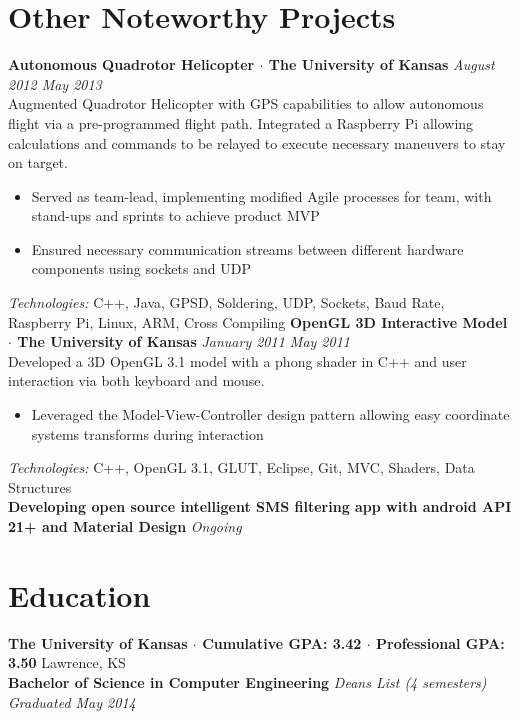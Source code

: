 \documentclass[10pt]{extarticle}
\begin{document}
\section*{Other Noteworthy Projects}
\textbf{Autonomous Quadrotor Helicopter $\cdot$ The University of Kansas} \hfill \textit{August 2012 \textendash{} May 2013} \\
Augmented Quadrotor Helicopter with GPS capabilities to allow autonomous flight via a pre-programmed flight path. Integrated a Raspberry Pi allowing calculations and commands to be relayed to execute necessary maneuvers to stay on target.
\begin{itemize}
  \item Served as team-lead, implementing modified Agile processes for team, with stand-ups and sprints to achieve product MVP
  \item Ensured necessary communication streams between different hardware components using sockets and UDP
\end{itemize}
\textit{Technologies:} C++, Java, GPSD, Soldering, UDP, Sockets, Baud Rate, Raspberry Pi, Linux, ARM, Cross Compiling
\textbf{OpenGL 3D Interactive Model $\cdot$ The University of Kansas} \hfill \textit{January 2011 \textendash{} May 2011} \\
Developed a 3D OpenGL 3.1 model with a phong shader in C++ and user interaction via both keyboard and mouse.
\begin{itemize}
  \item Leveraged the Model-View-Controller design pattern allowing easy coordinate systems transforms during interaction
\end{itemize}
\textit{Technologies:} C++, OpenGL 3.1, GLUT, Eclipse, Git, MVC, Shaders, Data Structures \\
\textbf{Developing open source intelligent SMS filtering app with android API 21+ and Material Design} \hfill \textit{Ongoing}

\section*{Education}
\textbf{The University of Kansas $\cdot$ Cumulative GPA: 3.42 $\cdot$ Professional GPA: 3.50}
\hfill
Lawrence, KS \\
\textbf{Bachelor of Science in Computer Engineering}
\textit{\textendash{} Dean\textquotesingle{}s List (4 semesters)}
\hfill
\textit{Graduated May 2014}
\end{document}
